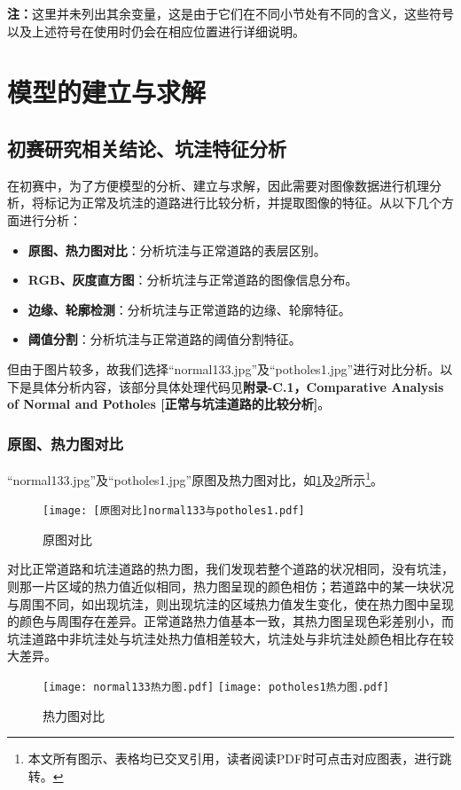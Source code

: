 \documentclass{MathorCupmodeling}
\begin{document}
	\textbf{注：}这里并未列出其余变量，这是由于它们在不同小节处有不同的含义，这些符号以及上述符号在使用时仍会在相应位置进行详细说明。

	\section{模型的建立与求解}
	\subsection{初赛研究相关结论、坑洼特征分析}\label{分析}
	在初赛中，为了方便模型的分析、建立与求解，因此需要对图像数据进行机理分析，将标记为正常及坑洼的道路进行比较分析，并提取图像的特征。从以下几个方面进行分析：
	\begin{itemize}
		\item \textbf{原图、热力图对比}：分析坑洼与正常道路的表层区别。
		\item \textbf{RGB、灰度直方图}：分析坑洼与正常道路的图像信息分布。
		\item \textbf{边缘、轮廓检测}：分析坑洼与正常道路的边缘、轮廓特征。
		\item \textbf{阈值分割}：分析坑洼与正常道路的阈值分割特征。
	\end{itemize}
	
	但由于图片较多，故我们选择“normal133.jpg”及“potholes1.jpg”进行对比分析。以下是具体分析内容，该部分具体处理代码见\textbf{附录-C.1，Comparative Analysis of Normal and Potholes [正常与坑洼道路的比较分析]}。
	\subsubsection{原图、热力图对比}
	“normal133.jpg”及“potholes1.jpg”原图及热力图对比，如\textcolor{blue}{\cref{fig:原图对比}}及\textcolor{blue}{\cref{fig:热力图对比}}所示\textcolor{blue}{\footnote{本文所有图示、表格均已交叉引用，读者阅读PDF时可点击对应图表，进行跳转。}}。
	\begin{figure}[H]
		\centering
			\centering
			\texttt{[image: [原图对比]normal133与potholes1.pdf]}
			\caption{原图对比}
			\label{fig:原图对比}
	\end{figure}
	
	对比正常道路和坑洼道路的热力图，我们发现若整个道路的状况相同，没有坑洼，则那一片区域的热力值近似相同，热力图呈现的颜色相仿；若道路中的某一块状况与周围不同，如出现坑洼，则出现坑洼的区域热力值发生变化，使在热力图中呈现的颜色与周围存在差异。正常道路热力值基本一致，其热力图呈现色彩差别小，而坑洼道路中非坑洼处与坑洼处热力值相差较大，坑洼处与非坑洼处颜色相比存在较大差异。
	\begin{figure}[H]
		\centering
		\texttt{[image: normal133热力图.pdf]}
		\hspace{0.3in}
		\texttt{[image: potholes1热力图.pdf]}
		\caption{热力图对比}
		\label{fig:热力图对比}
	\end{figure}
\end{document}
